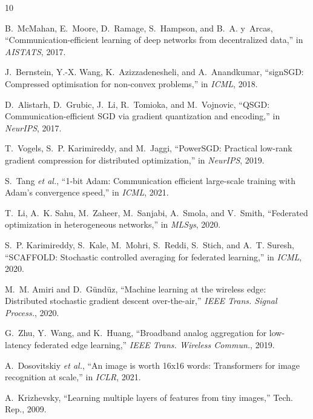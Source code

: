 \documentclass[conference]{IEEEtran}
\begin{document}

\begin{thebibliography}{10}

B.~McMahan, E.~Moore, D.~Ramage, S.~Hampson, and B.~A. y~Arcas,
``Communication-efficient learning of deep networks from decentralized data,''
in \emph{AISTATS}, 2017.

J.~Bernstein, Y.-X. Wang, K.~Azizzadenesheli, and A.~Anandkumar,
``signSGD: Compressed optimisation for non-convex problems,''
in \emph{ICML}, 2018.

D.~Alistarh, D.~Grubic, J.~Li, R.~Tomioka, and M.~Vojnovic,
``QSGD: Communication-efficient SGD via gradient quantization and encoding,''
in \emph{NeurIPS}, 2017.

T.~Vogels, S.~P. Karimireddy, and M.~Jaggi,
``PowerSGD: Practical low-rank gradient compression for distributed optimization,''
in \emph{NeurIPS}, 2019.

S.~Tang \emph{et al.},
``1-bit Adam: Communication efficient large-scale training with Adam's convergence speed,''
in \emph{ICML}, 2021.

T.~Li, A.~K. Sahu, M.~Zaheer, M.~Sanjabi, A.~Smola, and V.~Smith,
``Federated optimization in heterogeneous networks,''
in \emph{MLSys}, 2020.

S.~P. Karimireddy, S.~Kale, M.~Mohri, S.~Reddi, S.~Stich, and A.~T. Suresh,
``SCAFFOLD: Stochastic controlled averaging for federated learning,''
in \emph{ICML}, 2020.

M.~M. Amiri and D.~G{\"u}nd{\"u}z,
``Machine learning at the wireless edge: Distributed stochastic gradient descent over-the-air,''
\emph{IEEE Trans. Signal Process.}, 2020.

G.~Zhu, Y.~Wang, and K.~Huang,
``Broadband analog aggregation for low-latency federated edge learning,''
\emph{IEEE Trans. Wireless Commun.}, 2019.

A.~Dosovitskiy \emph{et al.},
``An image is worth 16x16 words: Transformers for image recognition at scale,''
in \emph{ICLR}, 2021.

A.~Krizhevsky,
``Learning multiple layers of features from tiny images,''
Tech. Rep., 2009.

\end{thebibliography}
\end{document}
